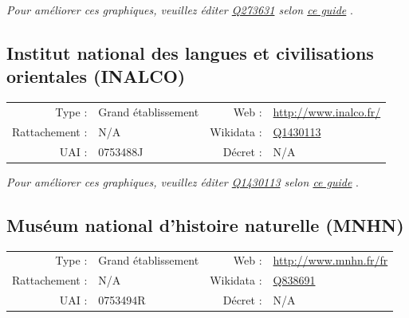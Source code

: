 \documentclass[12pt,french,landscape]{article}
\begin{document}
\textit{\scriptsize Pour améliorer ces graphiques, veuillez éditer \href{https://www.wikidata.org/entity/Q273631}{Q273631}  selon \href{https://github.com/cpesr/wikidataESR/blob/master/Rmd/wikidataESR.md}{ce guide}}
.


\newpage

\hypertarget{institut-national-des-langues-et-civilisations-orientales-inalco}{%
\subsection{Institut national des langues et civilisations orientales
(INALCO)}\label{institut-national-des-langues-et-civilisations-orientales-inalco}}

\begin{tabular*}{0.45\textwidth}{rp{2cm}rl}  
\hline  
Type : & Grand établissement & Web : &\href{http://www.inalco.fr/}{http://www.inalco.fr/} \\  
Rattachement : & N/A & Wikidata : & \href{https://www.wikidata.org/entity/Q1430113}{Q1430113} \\  
UAI : & 0753488J & Décret : & N/A \\  
\hline  
\end{tabular*}

\textit{\scriptsize Pour améliorer ces graphiques, veuillez éditer \href{https://www.wikidata.org/entity/Q1430113}{Q1430113}  selon \href{https://github.com/cpesr/wikidataESR/blob/master/Rmd/wikidataESR.md}{ce guide}}
.


\newpage

\hypertarget{musuxe9um-national-dhistoire-naturelle-mnhn}{%
\subsection{Muséum national d'histoire naturelle
(MNHN)}\label{musuxe9um-national-dhistoire-naturelle-mnhn}}

\begin{tabular*}{0.45\textwidth}{rp{2cm}rl}  
\hline  
Type : & Grand établissement & Web : &\href{http://www.mnhn.fr/fr}{http://www.mnhn.fr/fr} \\  
Rattachement : & N/A & Wikidata : & \href{https://www.wikidata.org/entity/Q838691}{Q838691} \\  
UAI : & 0753494R & Décret : & N/A \\  
\hline  
\end{tabular*}
\end{document}
